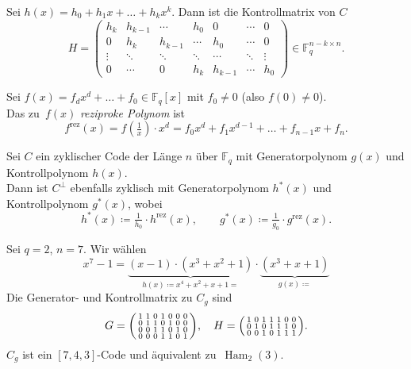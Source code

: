 \documentclass{cheat-sheet}
\newcommand{\F}{\mathbb{F}} %
\DeclareMathOperator{\Ham}{Ham} %
\newcommand{\rez}{\mathrm{rez}} %
\begin{document}
\begin{prop}
  Sei $h(x) = h_0 + h_1 x + \ldots + h_k x^k$.
  Dann ist die Kontrollmatrix von $C$
  \[
    H = \begin{pmatrix}
      h_k & h_{k-1} & \cdots & h_0 & 0 & \cdots & 0 \\
      0 & h_k & h_{k-1} & \cdots & h_0 & \cdots & 0 \\
      \vdots & \ddots & \ddots & \ddots & \cdots & \ddots & \vdots \\
      0 & \cdots & 0 & h_k & h_{k-1} & \cdots & h_0
    \end{pmatrix} \in \F_q^{n - k \times n}.
  \]
\end{prop}


\begin{defn}
  Sei $f(x) = f_d x^d + \ldots + f_0 \in \F_q[x]$ mit $f_0 \neq 0$ (also $f(0) \neq 0$). \\
  Das zu~$f(x)$ \emph{reziproke Polynom} ist
  \[
    f^\rez(x) = f(\tfrac{1}{x}) \cdot x^d = f_0 x^d + f_1 x^{d-1} + \ldots + f_{n-1} x + f_n.
  \]
\end{defn}

\begin{satz}
  Sei $C$ ein zyklischer Code der Länge $n$ über $\F_q$ mit Generatorpolynom $g(x)$ und Kontrollpolynom $h(x)$. \\
  Dann ist $C^\perp$ ebenfalls zyklisch mit Generatorpolynom $h^*(x)$ und Kontrollpolynom $g^*(x)$, wobei
  \[
    h^*(x) \coloneqq \tfrac{1}{h_0} \cdot h^\rez(x), \qquad
    g^*(x) \coloneqq \tfrac{1}{g_0} \cdot g^\rez(x).
  \]
\end{satz}

\begin{bsp}
  Sei $q=2$, $n=7$.
  Wir wählen
  \[
    x^7 - 1 = \underbrace{(x-1) \cdot (x^3 + x^2 + 1)}_{h(x) \coloneqq x^4 + x^2 + x + 1 =} \cdot \underbrace{(x^3 + x + 1)}_{g(x) \coloneqq}
  \]
  Die Generator- und Kontrollmatrix zu $C_g$ sind
  \[
    G = \begin{psmallmatrix}
      1 & 1 & 0 & 1 & 0 & 0 & 0 \\
      0 & 1 & 1 & 0 & 1 & 0 & 0 \\
      0 & 0 & 1 & 1 & 0 & 1 & 0 \\
      0 & 0 & 0 & 1 & 1 & 0 & 1
    \end{psmallmatrix}, \quad
    H = \begin{psmallmatrix}
      1 & 0 & 1 & 1 & 1 & 0 & 0 \\
      0 & 1 & 0 & 1 & 1 & 1 & 0 \\
      0 & 0 & 1 & 0 & 1 & 1 & 1
    \end{psmallmatrix}.
  \]
  $C_g$ ist ein $[7, 4, 3]$-Code und äquivalent zu~$\Ham_2(3)$.
\end{bsp}
\end{document}
